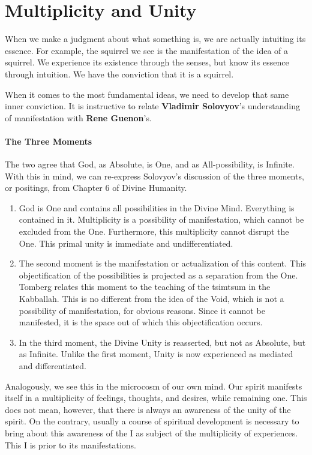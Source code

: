 \section{Multiplicity and Unity}

When we make a judgment about what something is, we are actually intuiting its essence. For example, the squirrel we see is the manifestation of the idea of a squirrel. We experience its existence through the senses, but know its essence through intuition. We have the conviction that it is a squirrel.

When it comes to the most fundamental ideas, we need to develop that same inner conviction. It is instructive to relate \textbf{Vladimir Solovyov}'s understanding of manifestation with \textbf{Rene Guenon}'s.

\paragraph{The Three Moments}
The two agree that God, as Absolute, is One, and as All-possibility, is Infinite. With this in mind, we can re-express Solovyov's discussion of the three moments, or positings, from Chapter 6 of Divine Humanity.

\begin{enumerate}
\item God is One and contains all possibilities in the Divine Mind. Everything is contained in it. Multiplicity is a possibility of manifestation, which cannot be excluded from the One. Furthermore, this multiplicity cannot disrupt the One. This primal unity is immediate and undifferentiated. 
\item The second moment is the manifestation or actualization of this content. This objectification of the possibilities is projected as a separation from the One. Tomberg relates this moment to the teaching of the tsimtsum in the Kabballah. This is no different from the idea of the Void, which is not a possibility of manifestation, for obvious reasons. Since it cannot be manifested, it is the space out of which this objectification occurs. 
\item In the third moment, the Divine Unity is reasserted, but not as Absolute, but as Infinite. Unlike the first moment, Unity is now experienced as mediated and differentiated. 
\end{enumerate}
Analogously, we see this in the microcosm of our own mind. Our spirit manifests itself in a multiplicity of feelings, thoughts, and desires, while remaining one. This does not mean, however, that there is always an awareness of the unity of the spirit. On the contrary, usually a course of spiritual development is necessary to bring about this awareness of the I as subject of the multiplicity of experiences. This I is prior to its manifestations.

